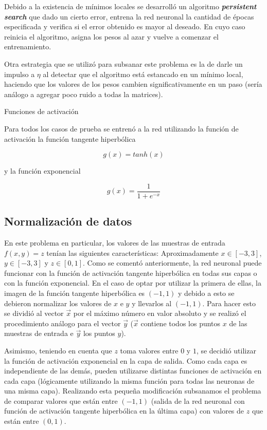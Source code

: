 \documentclass[%
    final,
    reprint,
    notitlepage,
    narroweqnarray,
    inline,
    twoside,
    invited
    ]{ieee}
\begin{document}
\par Debido a la existencia de mínimos locales se desarrolló un algoritmo  \textbf{\textit{persistent search}} que dado un cierto error, entrena
 la red neuronal la cantidad de épocas especificada y verifica si el error obtenido es mayor al deseado. En cuyo caso reinicia el algoritmo, asigna 
los pesos al azar y vuelve a comenzar el entrenamiento.\\
\par Otra estrategia que se utilizó para subsanar este problema es la de darle un impulso a $\eta$ al detectar que el algoritmo está estancado 
en un mínimo local, haciendo que los valores de los pesos cambien significativamente en un paso (sería análogo a agregar poco ruido a todas la matrices).

\par{Funciones de activación}

\par Para todos los casos de prueba se entrenó a la red utilizando la función de activación la función tangente hiperbólica

\begin{equation}
g(x) = tanh(x)
\end{equation}


y la función exponencial

\begin{equation}
g(x) = \frac{1}{1+e^{-x}}
\end{equation}

\subsection{Normalización de datos}

\par En este problema en particular, los valores de las muestras de entrada $f(x,y) = z$ tenían las siguientes características: Aproximadamente $x\in [-3,3]$, $y\in [-3,3]$ y $z\in [0,1]$. 
Como se comentó anteriormente, la red neuronal puede funcionar con la función de activación tangente hiperbólica en todas sus capas o con la función exponencial. En el caso de optar por utilizar la primera de ellas, la imagen de la función tangente hiperbólica es $(-1,1)$ y debido a esto se debieron normalizar los valores de $x$ e $y$ y llevarlos al $(-1,1)$. Para hacer esto se dividió al vector  $\vec{x}$ por el máximo número en valor absoluto y se realizó el procedimiento análogo para el vector $\vec{y}$ ($\vec{x}$ contiene todos los puntos $x$ de las muestras de entrada e $\vec{y}$ los puntos $y$).\\
\par Asimismo, teniendo en cuenta que $z$ toma valores entre $0$ y $1$, se decidió utilizar la función de activación exponencial en la capa de salida. Como cada capa es independiente de las demás, pueden utilizarse distintas funciones de activación en cada capa (lógicamente utilizando la misma función para todas las neuronas de una misma capa). Realizando esta pequeña modificación subsanamos el problema de comparar valores que están entre $(-1,1)$ (salida de la red neuronal con función de activación tangente hiperbólica en la última capa) con valores de $z$ que están entre $(0,1)$.
\end{document}
